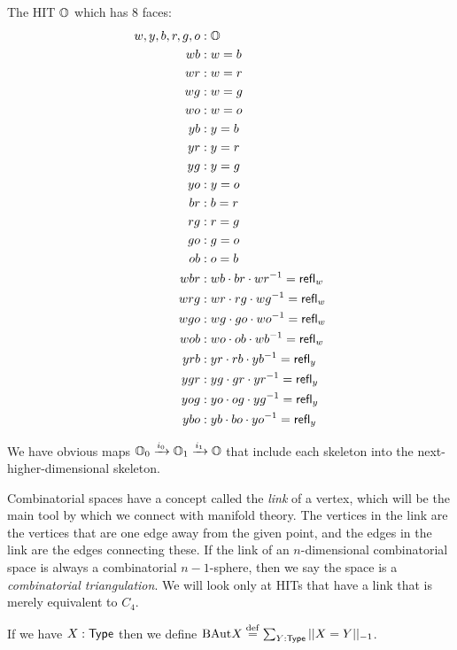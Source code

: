 \begin{mydef}
The HIT \( \mathbb{O} \) which has 8 faces:
\begin{align*}
w, y, b, r, g, o &: \mathbb{O} \\
wb &: w=b \\
wr &: w=r \\
wg &: w=g \\
wo &: w=o \\
yb &: y=b \\
yr &: y=r \\
yg &: y=g \\
yo &: y=o \\
br &: b=r \\
rg &: r=g \\
go &: g=o \\
ob &: o=b \\
wbr &: wb\cdot br\cdot wr^{-1} = \mathsf{refl}_w \\
wrg &: wr\cdot rg\cdot wg^{-1} = \mathsf{refl}_w \\
wgo &: wg\cdot go\cdot wo^{-1} = \mathsf{refl}_w \\
wob &: wo\cdot ob\cdot wb^{-1} = \mathsf{refl}_w \\
yrb &: yr\cdot rb\cdot yb^{-1} = \mathsf{refl}_y \\
ygr &: yg\cdot gr\cdot yr^{-1} = \mathsf{refl}_y \\
yog &: yo\cdot og\cdot yg^{-1} = \mathsf{refl}_y \\
ybo &: yb\cdot bo\cdot yo^{-1} = \mathsf{refl}_y
\end{align*}
\end{mydef}



We have obvious maps \( \mathbb{O}_0\xrightarrow[]{i_0} \mathbb{O}_1\xrightarrow[]{i_1} \mathbb{O} \) that include each skeleton into the next-higher-dimensional skeleton.

Combinatorial spaces have a concept called the \emph{link} of a vertex, which will be the main tool by which we connect with manifold theory. The vertices in the link are the vertices that are one edge away from the given point, and the edges in the link are the edges connecting these. If the link of an \( n \)-dimensional combinatorial space is always a combinatorial \( n-1 \)-sphere, then we say the space is a \emph{combinatorial triangulation}. We will look only at HITs that have a link that is merely equivalent to \( C_4 \).

\begin{mydef}
If we have \( X:\mathsf{Type} \) then we define \( \mathrm{BAut} X\stackrel{\mathrm{def}}{=} \sum_{Y:\mathsf{Type}} ||X=Y||_{-1} \). 
\end{mydef}


